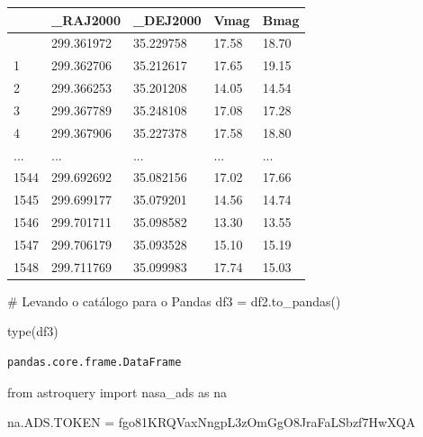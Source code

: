 \documentclass[
  letterpaper,
  DIV=11,
  numbers=noendperiod]{scrreprt}
\newenvironment{Shaded}{\begin{snugshade}}{\end{snugshade}}
\newcommand{\BuiltInTok}[1]{\textcolor[rgb]{0.00,0.23,0.31}{#1}}
\newcommand{\CommentTok}[1]{\textcolor[rgb]{0.37,0.37,0.37}{#1}}
\newcommand{\ImportTok}[1]{\textcolor[rgb]{0.00,0.46,0.62}{#1}}
\newcommand{\NormalTok}[1]{\textcolor[rgb]{0.00,0.23,0.31}{#1}}
\newcommand{\OperatorTok}[1]{\textcolor[rgb]{0.37,0.37,0.37}{#1}}
\newcommand{\StringTok}[1]{\textcolor[rgb]{0.13,0.47,0.30}{#1}}
\newcounter{none} %
\begin{document}
{\def\LTcaptype{none} %
\begin{longtable}[]{@{}lllll@{}}
\toprule\noalign{}
& \_RAJ2000 & \_DEJ2000 & Vmag & Bmag \\
\midrule\noalign{}
\endhead
\bottomrule\noalign{}
\endlastfoot
0 & 299.361972 & 35.229758 & 17.58 & 18.70 \\
1 & 299.362706 & 35.212617 & 17.65 & 19.15 \\
2 & 299.366253 & 35.201208 & 14.05 & 14.54 \\
3 & 299.367789 & 35.248108 & 17.08 & 17.28 \\
4 & 299.367906 & 35.227378 & 17.58 & 18.80 \\
... & ... & ... & ... & ... \\
1544 & 299.692692 & 35.082156 & 17.02 & 17.66 \\
1545 & 299.699177 & 35.079201 & 14.56 & 14.74 \\
1546 & 299.701711 & 35.098582 & 13.30 & 13.55 \\
1547 & 299.706179 & 35.093528 & 15.10 & 15.19 \\
1548 & 299.711769 & 35.099983 & 17.74 & 15.03 \\
\end{longtable}
}

\begin{Shaded}
\begin{Highlighting}[]
\CommentTok{\# Levando o catálogo para o Pandas}
\NormalTok{df3 }\OperatorTok{=}\NormalTok{ df2.to\_pandas()}
\end{Highlighting}
\end{Shaded}

\begin{Shaded}
\begin{Highlighting}[]
\BuiltInTok{type}\NormalTok{(df3)}
\end{Highlighting}
\end{Shaded}

\begin{verbatim}
pandas.core.frame.DataFrame
\end{verbatim}

\begin{Shaded}
\begin{Highlighting}[]
\ImportTok{from}\NormalTok{ astroquery }\ImportTok{import}\NormalTok{ nasa\_ads }\ImportTok{as}\NormalTok{ na}
\end{Highlighting}
\end{Shaded}

\begin{Shaded}
\begin{Highlighting}[]
\NormalTok{na.ADS.TOKEN }\OperatorTok{=} \StringTok{\textquotesingle{}fgo81KRQVaxNngpL3zOmGgO8JraFaLSbzf7HwXQA\textquotesingle{}}
\end{Highlighting}
\end{Shaded}
\end{document}
